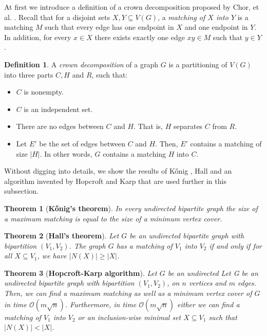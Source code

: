 \documentclass[en]{pracamgr}
\newtheorem{theorem}{Theorem}
\theoremstyle{definition}
\newtheorem{definition}{Definition}
\begin{document}
At first we introduce a definition of a crown decomposition proposed by Chor, et al. \cite{Crown}. Recall that for a disjoint sets $X,Y \subseteq V(G)$, a \textit{matching of $X$ into $Y$} is a matching $M$ such that every edge has one endpoint in $X$ and one endpoint in $Y$. In addition, for every $x \in X$ there exists exactly one edge $xy \in M$ such that $y \in Y$.

\begin{definition}
	A \textit{crown decomposition} of a graph $G$ is a partitioning of $V(G)$ into three parts $C,H$ and $R$, such that:
	\begin{itemize}
		\item $C$ is nonempty.
		\item $C$ is an independent set.
		\item There are no edges between $C$ and $H$. That is, $H$ separates $C$ from $R$.
		\item Let $E'$ be the set of edges between $C$ and $H$. Then, $E'$ contains a matching of size $|H|$. In other words, $G$ contains a matching $H$ into $C$.
	\end{itemize}
\end{definition}

Without digging into details, we show the results of Kőnig \cite{Konig}, Hall \cite{Hall} and an algorithm invented by Hopcroft and Karp \cite{Hopcroft-Karp} that are used further in this subsection.

\begin{theorem}[\textbf{Kőnig's theorem}]
	In every undirected bipartite graph the size of a maximum matching is equal to the size of a minimum vertex cover.
\end{theorem}

\begin{theorem}[\textbf{Hall's theorem}]
	Let $G$ be an undirected bipartite graph with bipartition $(V_1,V_2)$. The graph $G$ has a matching of $V_1$ into $V_2$ if and only if for all $X \subseteq V_1$, we have $|N(X)| \geq |X|$.
\end{theorem}

\begin{theorem}[\textbf{Hopcroft-Karp algorithm}]
	Let $G$ be an undirected Let G be an undirected bipartite graph with bipartition $(V_1,V_2)$, on $n$ vertices and $m$ edges.	Then, we can find a maximum matching as well as a minimum vertex cover of $G$ in time $\mathcal{O}(m\sqrt{n})$. Furthermore, in time $\mathcal{O}(m\sqrt{n})$ either we can find a matching of $V_1$ into $V_2$ or an inclusion-wise minimal set $X \subseteq V_1$ such that $|N(X)| < |X|$.
\end{theorem}
\end{document}
